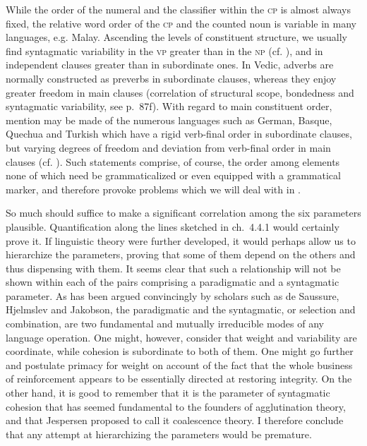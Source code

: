 While the order of the numeral and the classifier within the \textsc{cp} is almost always fixed, the relative word order of the \textsc{cp} and the counted noun is variable in many languages, e.g. Malay. Ascending the levels of constituent structure, we usually find syntagmatic variability in the \textsc{vp} greater than in the \textsc{np} (cf. \citet[92f]{Givón1975}), and in independent clauses greater than in subordinate ones. In Vedic, adverbs are normally constructed as preverbs in subordinate clauses, whereas they enjoy greater freedom in main clauses (correlation of structural scope, bondedness and syntagmatic variability, see p.~87f). With regard to main constituent order, mention may be made of the numerous languages such as German, Basque, Quechua and Turkish which have a rigid verb-final order in subordinate clauses, but varying degrees of freedom and deviation from verb-final order in main clauses (cf. \citet{Ross1973}). Such statements comprise, of course, the order among elements none of which need be grammaticalized or even equipped with a grammatical marker, and therefore provoke problems which we will deal with in .


 


So much should suffice to make a significant correlation among the six parameters plausible. Quantification along the lines sketched in ch.~4.4.1 would certainly prove it. If linguistic theory were further developed, it would perhaps allow us to hierarchize the parameters, proving that some of them depend on the others and thus dispensing with them. It seems clear that such a relationship will not be shown within each of the pairs comprising a paradigmatic and a syntagmatic parameter. As has been argued convincingly by scholars such as de Saussure, Hjelmslev and Jakobson, the paradigmatic and the syntagmatic, or selection and combination, are two fundamental and mutually irreducible modes of any language operation. One might, however, consider that weight and variability are coordinate, while cohesion is subordinate to both of them. One might go further and postulate primacy for weight on account of the fact that the whole business of reinforcement appears to be essentially directed at restoring integrity. On the other hand, it is good to remember that it is the parameter of syntagmatic cohesion that has seemed fundamental to the founders of agglutination theory, and that Jespersen proposed to call it coalescence theory. I therefore conclude that any attempt at hierarchizing the parameters would be premature.

